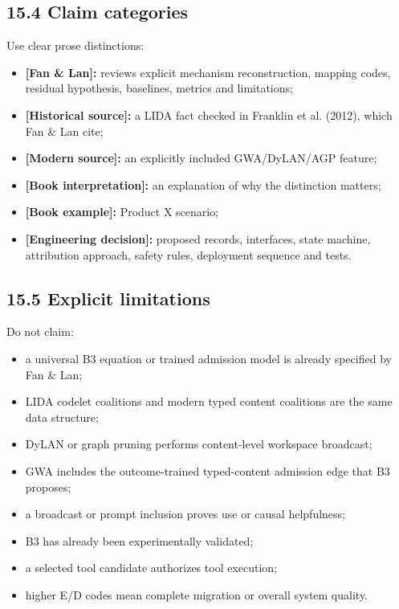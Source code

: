 \subsection{15.4 Claim categories}\label{154-claim-categories}

Use clear prose distinctions:

\begin{itemize}
\tightlist
\item
  \textbf{{[}Fan \& Lan{]}:} review\textquotesingle s explicit mechanism reconstruction, mapping codes, residual hypothesis, baselines, metrics and limitations;
\item
  \textbf{{[}Historical source{]}:} a LIDA fact checked in Franklin et al. (2012), which Fan \& Lan cite;
\item
  \textbf{{[}Modern source{]}:} an explicitly included GWA/DyLAN/AGP feature;
\item
  \textbf{{[}Book interpretation{]}:} an explanation of why the distinction matters;
\item
  \textbf{{[}Book example{]}:} Product X scenario;
\item
  \textbf{{[}Engineering decision{]}:} proposed records, interfaces, state machine, attribution approach, safety rules, deployment sequence and tests.
\end{itemize}

\subsection{15.5 Explicit limitations}\label{155-explicit-limitations}

Do not claim:

\begin{itemize}
\tightlist
\item
  a universal B3 equation or trained admission model is already specified by Fan \& Lan;
\item
  LIDA codelet coalitions and modern typed content coalitions are the same data structure;
\item
  DyLAN or graph pruning performs content-level workspace broadcast;
\item
  GWA includes the outcome-trained typed-content admission edge that B3 proposes;
\item
  a broadcast or prompt inclusion proves use or causal helpfulness;
\item
  B3 has already been experimentally validated;
\item
  a selected tool candidate authorizes tool execution;
\item
  higher E/D codes mean complete migration or overall system quality.
\end{itemize}

